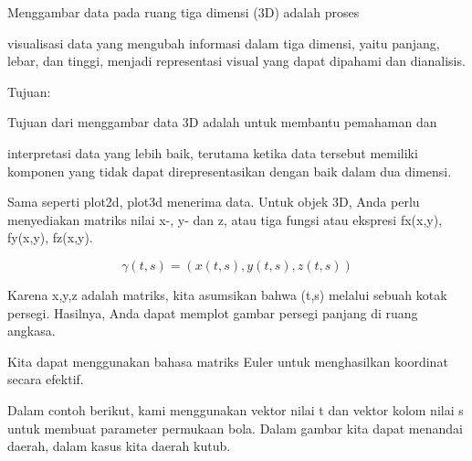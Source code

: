\documentclass[a4paper,10pt]{article}
\begin{document}
\begin{eulernotebook}
\begin{eulercomment}
\begin{eulercomment}
\begin{eulercomment}
\end{eulercomment}
\begin{eulerttcomment}
  Menggambar data pada ruang tiga dimensi (3D) adalah proses
\end{eulerttcomment}
\begin{eulercomment}
visualisasi data yang mengubah informasi dalam tiga dimensi, yaitu
panjang, lebar, dan tinggi, menjadi representasi visual yang dapat
dipahami dan dianalisis.

Tujuan:

\end{eulercomment}
\begin{eulerttcomment}
  Tujuan dari menggambar data 3D adalah untuk membantu pemahaman dan
\end{eulerttcomment}
\begin{eulercomment}
interpretasi data yang lebih baik, terutama ketika data tersebut
memiliki komponen yang tidak dapat direpresentasikan dengan baik dalam
dua dimensi.

Sama seperti plot2d, plot3d menerima data. Untuk objek 3D, Anda perlu
menyediakan matriks nilai x-, y- dan z, atau tiga fungsi atau ekspresi
fx(x,y), fy(x,y), fz(x,y).

\end{eulercomment}
\begin{eulerformula}
\[
\gamma(t,s) = (x(t,s),y(t,s),z(t,s))
\]
\end{eulerformula}
\begin{eulercomment}
Karena x,y,z adalah matriks, kita asumsikan bahwa (t,s) melalui sebuah
kotak persegi. Hasilnya, Anda dapat memplot gambar persegi panjang di
ruang angkasa.

Kita dapat menggunakan bahasa matriks Euler untuk menghasilkan
koordinat secara efektif.

Dalam contoh berikut, kami menggunakan vektor nilai t dan vektor kolom
nilai s untuk membuat parameter permukaan bola. Dalam gambar kita
dapat menandai daerah, dalam kasus kita daerah kutub.


\end{eulercomment}
\end{eulercomment}
\end{eulercomment}
\end{eulernotebook}
\end{document}

